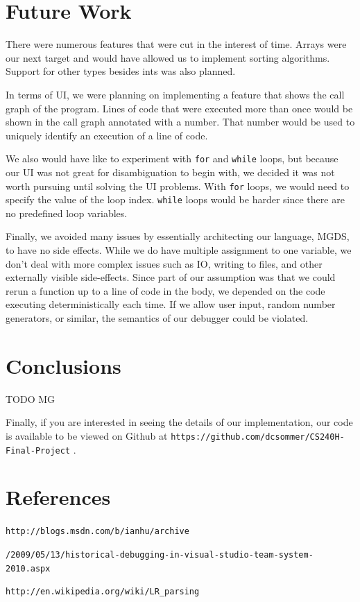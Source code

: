\documentclass[letterpaper, 10pt]{article}
\newcommand{\ttt}{\texttt}
\begin{document}
\section{Future Work}
There were numerous features that were cut in the interest of time. Arrays
were our next target and would have allowed us to implement sorting
algorithms. Support for other types besides ints was also planned.

In terms of UI, we were planning on implementing a feature that shows the
call graph of the program. Lines of code that were executed more than once
would be shown in the call graph annotated with a number. That number
would be used to uniquely identify an execution of a line of code.

We also would have like to experiment with \ttt{for} and \ttt{while}
loops, but because our UI was not great for disambiguation to begin with,
we decided it was not worth pursuing until solving the UI problems. With
\ttt{for} loops, we would need to specify the value of the loop
index. \ttt{while} loops would be harder since there are no predefined loop
variables. 

Finally, we avoided many issues by essentially architecting our language,
MGDS, to have no side effects. While we do have multiple assignment to one
variable, we don't deal with more complex issues such as IO, writing to
files, and other externally visible side-effects. Since part of our
assumption was that we could rerun a function up to a line of code in the
body, we depended on the code executing deterministically each time. If we
allow user input, random number generators, or similar, the semantics of
our debugger could be violated.

\section{Conclusions}
TODO MG

Finally, if you are interested in seeing the details of our
implementation, our code is available to be viewed on Github at
\ttt{https://github.com/dcsommer/CS240H-Final-Project} .

\section{References}
\begin{enumerate}[{[}1{]}]

\item
\ttt{http://blogs.msdn.com/b/ianhu/archive}

\ttt{/2009/05/13/historical-debugging-in-visual-studio-team-system-2010.aspx}

\item
\ttt{http://en.wikipedia.org/wiki/LR\_parsing}

\item

\end{enumerate}
\end{document}
